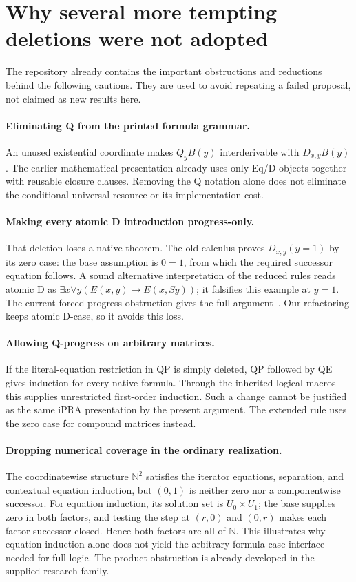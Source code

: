 \documentclass[11pt]{article}
\theoremstyle{definition}
\begin{document}
\section{Why several more tempting deletions were not adopted}

The repository already contains the important obstructions and reductions
behind the following cautions. They are used to avoid repeating a failed
proposal, not claimed as new results here.

\paragraph{Eliminating Q from the printed formula grammar.}
An unused existential coordinate makes $Q_yB(y)$ interderivable with
$D_{x,y}B(y)$. The earlier mathematical presentation already uses only Eq/D
objects together with reusable closure clauses. Removing the Q notation
alone does not eliminate the conditional-universal resource or its
implementation cost.

\paragraph{Making every atomic D introduction progress-only.}
That deletion loses a native theorem. The old calculus proves
$D_{x,y}(y=1)$ by its zero case: the base assumption is $0=1$, from which
the required successor equation follows. A sound alternative interpretation
of the reduced rules reads atomic D as
$\exists x\forall y(E(x,y)\to E(x,Sy))$; it falsifies this example at $y=1$.
The current forced-progress obstruction gives the full argument~\cite{obstruction}.
Our refactoring keeps atomic D-case, so it avoids this loss.

\paragraph{Allowing Q-progress on arbitrary matrices.}
If the literal-equation restriction in QP is simply deleted, QP followed by
QE gives induction for every native formula. Through the inherited logical
macros this supplies unrestricted first-order induction. Such a change
cannot be justified as the same iPRA presentation by the present argument.
The extended rule uses the zero case for compound matrices instead.

\paragraph{Dropping numerical coverage in the ordinary realization.}
The coordinatewise structure $\mathbb N^2$ satisfies the iterator equations,
separation, and contextual equation induction, but $(0,1)$ is neither zero
nor a componentwise successor. For equation induction, its solution set is
$U_0\times U_1$; the base supplies zero in both factors, and testing the step
at $(r,0)$ and $(0,r)$ makes each factor successor-closed. Hence both factors
are all of $\mathbb N$. This illustrates why equation induction alone does
not yield the arbitrary-formula case interface needed for full logic. The
product obstruction is already developed in the supplied research family.
\end{document}
